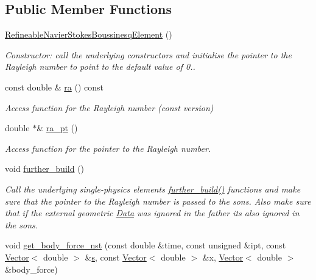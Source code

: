 \subsection*{Public Member Functions}
\begin{DoxyCompactItemize}
\item 
\hyperlink{classoomph_1_1RefineableNavierStokesBoussinesqElement_af9fd72e50fb7d6aaf43bd982ce3de295}{Refineable\+Navier\+Stokes\+Boussinesq\+Element} ()
\begin{DoxyCompactList}\small\item\em Constructor\+: call the underlying constructors and initialise the pointer to the Rayleigh number to point to the default value of 0.. \end{DoxyCompactList}\item 
const double \& \hyperlink{classoomph_1_1RefineableNavierStokesBoussinesqElement_ae18350ad83634633acea59b60123d3c0}{ra} () const
\begin{DoxyCompactList}\small\item\em Access function for the Rayleigh number (const version) \end{DoxyCompactList}\item 
double $\ast$\& \hyperlink{classoomph_1_1RefineableNavierStokesBoussinesqElement_ac2f3ff1714a6859b151da46109eda0ae}{ra\+\_\+pt} ()
\begin{DoxyCompactList}\small\item\em Access function for the pointer to the Rayleigh number. \end{DoxyCompactList}\item 
void \hyperlink{classoomph_1_1RefineableNavierStokesBoussinesqElement_a8b7b18f473b0fa9c4127de305e5a6ccc}{further\+\_\+build} ()
\begin{DoxyCompactList}\small\item\em Call the underlying single-\/physics element\textquotesingle{}s \hyperlink{classoomph_1_1RefineableNavierStokesBoussinesqElement_a8b7b18f473b0fa9c4127de305e5a6ccc}{further\+\_\+build()} functions and make sure that the pointer to the Rayleigh number is passed to the sons. Also make sure that if the external geometric \hyperlink{classoomph_1_1Data}{Data} was ignored in the father it\textquotesingle{}s also ignored in the sons. \end{DoxyCompactList}\item 
void \hyperlink{classoomph_1_1RefineableNavierStokesBoussinesqElement_a7c422f8666f9acef4d26f187a4dc4e28}{get\+\_\+body\+\_\+force\+\_\+nst} (const double \&time, const unsigned \&ipt, const \hyperlink{classoomph_1_1Vector}{Vector}$<$ double $>$ \&\hyperlink{cfortran_8h_ab7123126e4885ef647dd9c6e3807a21c}{s}, const \hyperlink{classoomph_1_1Vector}{Vector}$<$ double $>$ \&x, \hyperlink{classoomph_1_1Vector}{Vector}$<$ double $>$ \&body\+\_\+force)

\end{DoxyCompactItemize}

